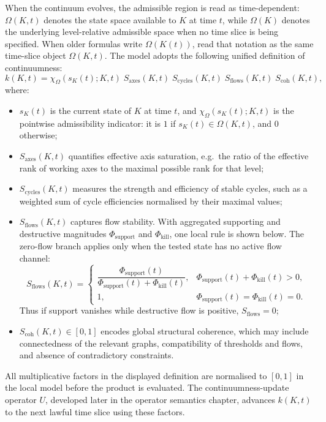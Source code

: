 When the continuum evolves, the admissible region is read as time-dependent:
\(\Omega(K,t)\) denotes the state space available to \(K\) at time \(t\), while
\(\Omega(K)\) denotes the underlying level-relative admissible space when no
time slice is being specified.
When older formulas write \(\Omega(K(t))\), read that notation as the same
time-slice object \(\Omega(K,t)\).
The model adopts the following unified definition of continuumness:
\[
    k(K,t)
    = \chi_{\Omega}(s_K(t);K,t)\;
      S_{\mathrm{axes}}(K,t)\;
      S_{\mathrm{cycles}}(K,t)\;
      S_{\mathrm{flows}}(K,t)\;
      S_{\mathrm{coh}}(K,t),
\]
where:
\begin{itemize}
    \item \(s_K(t)\) is the current state of \(K\) at time \(t\), and
          \(\chi_{\Omega}(s_K(t);K,t)\) is the pointwise admissibility
          indicator:
          it is \(1\) if \(s_K(t)\in\Omega(K,t)\), and \(0\) otherwise;
    \item \(S_{\mathrm{axes}}(K,t)\) quantifies effective axis saturation, e.g.\ the ratio of the effective rank of working axes to the maximal possible rank for that level;
    \item \(S_{\mathrm{cycles}}(K,t)\) measures the strength and efficiency of stable cycles, such as a weighted sum of cycle efficiencies normalised by their maximal values;
    \item \(S_{\mathrm{flows}}(K,t)\) captures flow stability. With aggregated
          supporting and destructive magnitudes
          \(\Phi_{\mathrm{support}}\) and \(\Phi_{\mathrm{kill}}\), one local
          rule is shown below. The zero-flow branch applies only when the
          tested state has no active flow channel:
          \[
              S_{\mathrm{flows}}(K,t)=
              \begin{cases}
              \dfrac{\Phi_{\mathrm{support}}(t)}
                    {\Phi_{\mathrm{support}}(t)+\Phi_{\mathrm{kill}}(t)},
                    & \Phi_{\mathrm{support}}(t)+\Phi_{\mathrm{kill}}(t)>0,\\[0.7em]
              1, & \Phi_{\mathrm{support}}(t)=\Phi_{\mathrm{kill}}(t)=0.
              \end{cases}
          \]
          Thus if support vanishes while destructive flow is positive,
          \(S_{\mathrm{flows}}=0\);
    \item \(S_{\mathrm{coh}}(K,t)\in[0,1]\) encodes global structural
          coherence, which may include connectedness of the relevant graphs,
          compatibility of thresholds and flows, and absence of contradictory
          constraints.
\end{itemize}
All multiplicative factors in the displayed definition are normalised to
\([0,1]\) in the local model before the product is evaluated.
The continuumness-update operator \(U\), developed later in
the operator semantics chapter, advances \(k(K,t)\) to the next lawful time
slice using these factors.

